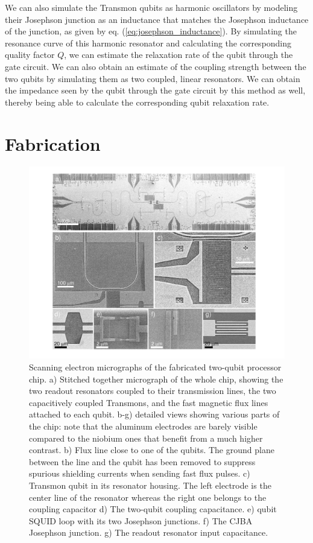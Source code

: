 \smallskip


We can also simulate the Transmon qubits as harmonic oscillators by modeling their Josephson junction as an inductance that matches the Josephson inductance of the junction, as given by eq. (\ref{eq:josephson_inductance}). By simulating the resonance curve of this harmonic resonator and calculating the corresponding quality factor $Q$, we can estimate the relaxation rate of the qubit through the gate circuit. We can also obtain an estimate of the coupling strength between the two qubits by simulating them as two coupled, linear resonators. We can obtain the impedance seen by the qubit through the gate circuit by this method as well, thereby being able to calculate the corresponding qubit relaxation rate.

\section{Fabrication}

\begin{figure}[p!]
	\includegraphics[width=1\textwidth]{"./material/figures/2-qubit-processor/processor photos"}
	\caption{Scanning electron micrographs of the fabricated two-qubit processor chip. a) Stitched together micrograph of the whole chip, showing the two readout resonators coupled to their transmission lines, the two capacitively coupled Transmons, and the fast magnetic flux lines attached to each qubit. b-g) detailed views showing various parts of the chip: note that the aluminum electrodes are barely visible compared to the niobium ones that benefit from a much higher contrast. b) Flux line close to one of the qubits. The ground plane between the line and the qubit has been removed to suppress spurious shielding currents when sending fast flux pulses. c) Transmon qubit in its resonator housing. The left electrode is the center line of the resonator whereas the right one belongs to the coupling capacitor d) The two-qubit coupling capacitance. e) qubit SQUID loop with its two Josephson junctions. f) The CJBA Josephson junction. g) The readout resonator input capacitance.}
	\label{fig:qubit_chip_photos}
\end{figure}

